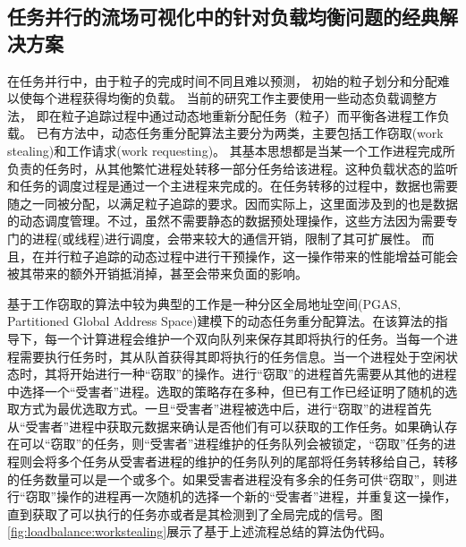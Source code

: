 \subsection{任务并行的流场可视化中的针对负载均衡问题的经典解决方案}
在任务并行中，由于粒子的完成时间不同且难以预测，
初始的粒子划分和分配难以使每个进程获得均衡的负载。
当前的研究工作主要使用一些动态负载调整方法，
即在粒子追踪过程中通过动态地重新分配任务（粒子）而平衡各进程工作负载。
已有方法中，动态任务重分配算法主要分为两类，主要包括工作窃取(work stealing)和工作请求(work requesting)。
其基本思想都是当某一个工作进程完成所负责的任务时，从其他繁忙进程处转移一部分任务给该进程。这种负载状态的监听和任务的调度过程是通过一个主进程来完成的。在任务转移的过程中，数据也需要随之一同被分配，以满足粒子追踪的要求。因而实际上，这里面涉及到的也是数据的动态调度管理。不过，虽然不需要静态的数据预处理操作，这些方法因为需要专门的进程(或线程)进行调度，会带来较大的通信开销，限制了其可扩展性。
而且，在并行粒子追踪的动态过程中进行干预操作，这一操作带来的性能增益可能会被其带来的额外开销抵消掉，甚至会带来负面的影响。

基于工作窃取的算法中较为典型的工作是一种分区全局地址空间(PGAS, Partitioned Global Address Space)建模下的动态任务重分配算法\parencite{DinanLSKN09}。在该算法的指导下，每一个计算进程会维护一个双向队列来保存其即将执行的任务。当每一个进程需要执行任务时，其从队首获得其即将执行的任务信息。当一个进程处于空闲状态时，其将开始进行一种“窃取”的操作。进行“窃取”的进程首先需要从其他的进程中选择一个“受害者”进程。选取的策略存在多种，但已有工作已经证明了随机的选取方式为最优选取方式\parencite{blumofe1999scheduling}。一旦“受害者”进程被选中后，进行“窃取”的进程首先从“受害者”进程中获取元数据来确认是否他们有可以获取的工作任务。如果确认存在可以“窃取”的任务，则“受害者”进程维护的任务队列会被锁定，“窃取”任务的进程则会将多个任务从受害者进程的维护的任务队列的尾部将任务转移给自己，转移的任务数量可以是一个或多个。如果受害者进程没有多余的任务可供“窃取”，则进行“窃取”操作的进程再一次随机的选择一个新的“受害者”进程，并重复这一操作，直到获取了可以执行的任务亦或者是其检测到了全局完成的信号。图\ref{fig:loadbalance:workstealing}展示了基于上述流程总结的算法伪代码。

